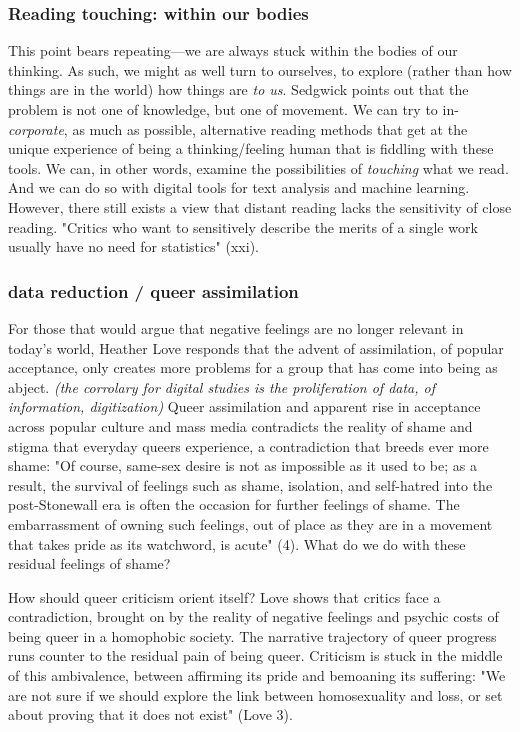\documentclass[11pt]{article}
\begin{document}
\subsubsection{Reading touching: within our bodies}
\label{sec:org6632e28}
This point bears repeating---we are always stuck within the bodies of
our thinking. As such, we might as well turn to ourselves, to explore
(rather than how things are in the world) how things are \emph{to
us}. Sedgwick points out that the problem is not one of knowledge, but
one of movement. We can try to in-\emph{corporate}, as much as possible,
alternative reading methods that get at the unique experience of being
a thinking/feeling human that is fiddling with these tools. We can, in
other words, examine the possibilities of \emph{touching} what we read. And
we can do so with digital tools for text analysis and machine
learning.  However, there still exists a view that distant reading
lacks the sensitivity of close reading. "Critics who want to
sensitively describe the merits of a single work usually have no need
for statistics" (xxi).

\subsubsection{data reduction / queer assimilation}
\label{sec:org4b07dbb}
For those that would argue that negative feelings are no longer
relevant in today's world, Heather Love responds that the advent of
assimilation, of popular acceptance, only creates more problems for a
group that has come into being as abject. \emph{(the corrolary for digital
studies is the proliferation of data, of information, digitization)}
Queer assimilation and apparent rise in acceptance across popular
culture and mass media contradicts the reality of shame and stigma
that everyday queers experience, a contradiction that breeds ever more
shame: "Of course, same-sex desire is not as impossible as it used to
be; as a result, the survival of feelings such as shame, isolation,
and self-hatred into the post-Stonewall era is often the occasion for
further feelings of shame. The embarrassment of owning such feelings,
out of place as they are in a movement that takes pride as its
watchword, is acute" (4). What do we do with these residual feelings
of shame?

How should queer criticism orient itself? Love shows that critics face
a contradiction, brought on by the reality of negative feelings and
psychic costs of being queer in a homophobic society. The narrative
trajectory of queer progress runs counter to the residual pain of
being queer. Criticism is stuck in the middle of this ambivalence,
between affirming its pride and bemoaning its suffering: "We are not
sure if we should explore the link between homosexuality and loss, or
set about proving that it does not exist" (Love 3).
\end{document}
